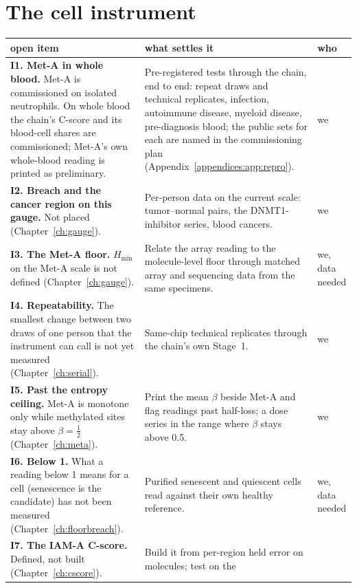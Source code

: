 \section{The cell instrument}
{\small\begin{longtable}{@{}>{\raggedright\arraybackslash}p{}>{\raggedright\arraybackslash}p{}>{\raggedright\arraybackslash}p{}@{}}
\toprule
open item & what settles it & who \\\midrule\endhead
\textbf{I1. Met-A in whole blood.} Met-A is commissioned on isolated neutrophils. On whole blood the chain's C-score and its blood-cell shares are commissioned; Met-A's own whole-blood reading is printed as preliminary. & Pre-registered tests through the chain, end to end: repeat draws and technical replicates, infection, autoimmune
 disease, myeloid disease, pre-diagnosis blood; the public sets for each are named in the commissioning plan (Appendix~\ref{appendices:app:repro}). & we \\\cmidrule[0.2pt]{1-3}
\textbf{I2. Breach and the cancer region on this gauge.} Not placed (Chapter~\ref{ch:gauge}).
 & Per-person data on the current scale: tumor--normal pairs, the DNMT1-inhibitor series, blood cancers. & we \\\cmidrule[0.2pt]{1-3}
\textbf{I3. The Met-A floor.} $H_{\min}$ on the Met-A scale is not defined (Chapter~\ref{ch:gauge}). & Relate the array reading to the
 molecule-level floor through matched array and sequencing data from the same specimens. & we, data needed \\\cmidrule[0.2pt]{1-3}
\textbf{I4. Repeatability.} The smallest change between two draws of one person that the instrument can call is not yet measured (Chapter~\ref{ch:serial}). & Same-chip technical replicates through the
 chain's own Stage~1. & we \\\cmidrule[0.2pt]{1-3}
\textbf{I5. Past the entropy ceiling.} Met-A is monotone only while methylated sites stay above $\beta=\tfrac12$ (Chapter~\ref{ch:meta}).
 & Print the mean $\beta$ beside Met-A and flag readings past half-loss; a dose series in the range where $\beta$ stays above 0.5. & we \\\cmidrule[0.2pt]{1-3}
\textbf{I6. Below 1.} What a reading below 1 means for a cell (senescence is the candidate) has not been measured (Chapter~\ref{ch:floorbreach}).
 & Purified senescent and quiescent cells read against their own healthy reference. & we, data needed \\\cmidrule[0.2pt]{1-3}
\textbf{I7. The IAM-A C-score.} Defined, not built (Chapter~\ref{ch:cscore}). & Build it from per-region held error on molecules; test on the

\end{longtable}}
